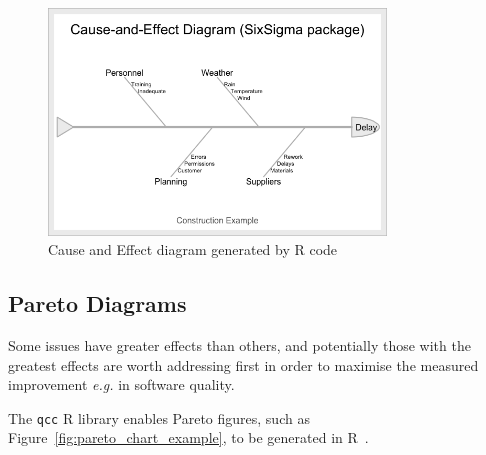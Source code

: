 \begin{figure}[ht]
    \centering
    \includegraphics[width=0.8\textwidth]{images/cause-effect-diagram.png}
    \caption{Cause and Effect diagram generated by R code}
    \label{fig:ishikawa-example-in-R}
\end{figure}

\hypertarget{pareto.diagrams.in.r}{}
\subsection{Pareto Diagrams}
Some issues have greater effects than others, and potentially those with the greatest effects are worth addressing first in order to maximise the measured improvement \emph{e.g.} in software quality.

The \texttt{qcc} R library enables Pareto figures, such as Figure~\ref{fig:pareto_chart_example}, to be generated in R~\cite{7_basic_quality_tools_with_R}. 

